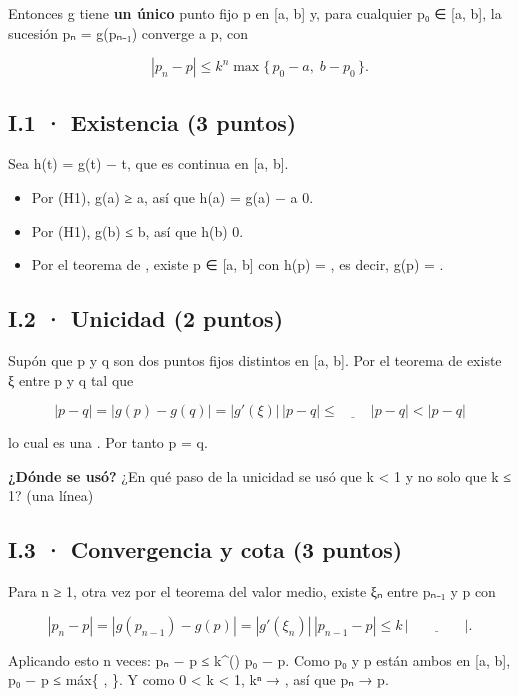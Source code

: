 Entonces g tiene \textbf{un único} punto fijo p en {[}a, b{]} y, para cualquier p₀ ∈ {[}a, b{]}, la sucesión pₙ = g(pₙ₋₁) converge a p, con

\[|p_n - p| \le k^n \max\{\,p_0 - a,\; b - p_0\,\}.\]

\subsection{I.1 · Existencia (3 puntos)}

Sea h(t) = g(t) − t, que es continua en {[}a, b{]}.

\begin{itemize}
\tightlist
\item
  Por (H1), g(a) ≥ a, así que h(a) = g(a) − a  0.
\item
  Por (H1), g(b) ≤ b, así que h(b)  0.
\item
  Por el teorema de , existe p ∈ {[}a, b{]} con h(p) = , es decir, g(p) = .
\end{itemize}

\subsection{I.2 · Unicidad (2 puntos)}

Supón que p y q son dos puntos fijos distintos en {[}a, b{]}. Por el teorema de  existe ξ entre p y q tal que

\[|p - q| = |g(p) - g(q)| = |g'(\xi)|\,|p - q| \le \underline{\qquad}\;|p - q| < |p - q|\]

lo cual es una . Por tanto p = q.

\textbf{¿Dónde se usó?} ¿En qué paso de la unicidad se usó que k \textless{} 1 y no solo que k ≤ 1? (una línea)

\subsection{I.3 · Convergencia y cota (3 puntos)}

Para n ≥ 1, otra vez por el teorema del valor medio, existe ξₙ entre pₙ₋₁ y p con

\[|p_n - p| = |g(p_{n-1}) - g(p)| = |g'(\xi_n)|\,|p_{n-1} - p| \le k\,|\underline{\qquad\qquad}|.\]

Aplicando esto n veces: \textbar pₙ − p\textbar{} ≤ k\^{}() \textbar p₀ − p\textbar. Como p₀ y p están ambos en {[}a, b{]}, \textbar p₀ − p\textbar{} ≤ máx\{  ,  \}. Y como 0 \textless{} k \textless{} 1, kⁿ → , así que pₙ → p.

